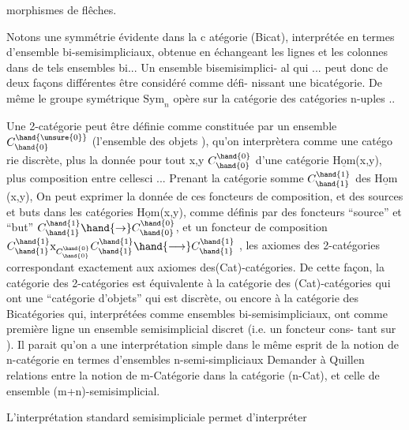 morphismes de flêches.

Notons une symmétrie évidente dans la c atégorie (Bicat), interprétée
en termes d'ensemble bi-semisimpliciaux, obtenue en échangeant les lignes
et les colonnes dans  de tels ensembles bi... Un ensemble bisemisimplici-%
al qui ... peut donc de deux façons différentes être considéré comme défi-%
nissant une bicatégorie. De même le groupe symétrique $\mathrm{Sym}_n$ opère sur
la catégorie   des catégories n-uples ..

Une 2-catégorie peut être définie comme constituée par un ensemble
 $C^{\hand{\unsure{0}}}_{\hand{0}}$ (l'ensemble des objets ), qu'on interprètera comme une catégo
rie discrète, plus la donnée pour tout x,y \hand{$\in$}$C^{\hand{0}}_{\hand{0}}$ d'une catégorie $\underline{\mathrm{Hom}}$(x,y),
plus   composition entre celles\unsure{\hand{-}}ci ... Prenant la catégorie somme  $C^{\hand{1}}_{\hand{1}}$
des $\underline{\mathrm{Hom}}$(x,y), On peut exprimer la donnée de ces foncteurs de composition,
et des sources et buts  dans les catégories $\underline{\mathrm{Hom}}$(x,y), comme définis par
des foncteurs ``source'' et ``but'' $C^{\hand{1}}_{\hand{1}} \hand{\to} C^{\hand{0}}_{\hand{0}}$, et un foncteur de composition
$C^{\hand{1}}_{\hand{1}} \mathrm{x}_{C^{\hand{0}}_{\hand{0}}} C^{\hand{1}}_{\hand{1}} \hand{\longrightarrow} C^{\hand{1}}_{\hand{1}}$ , les axiomes des 2-catégories correspondant exactement aux
axiomes des(Cat)-catégories. De cette façon, la catégorie des 2-catégories
est équivalente à la catégorie des (Cat)-catégories qui ont une ``catégorie
d'objets'' qui est discrète, ou encore à la catégorie des Bicatégories
qui, interprétées comme ensembles bi-semisimpliciaux, ont  comme
première ligne un ensemble semisimplicial discret (i.e. un foncteur cons-%
tant sur \hand{$\Delta$} ). Il parait qu'on a une interprétation simple dans le même
esprit de la notion de n-catégorie en termes d'ensembles n-semi-simpliciaux
\margin{$\|$}  Demander à Quillen relations entre la notion de m-Catégorie dans
\margin{$\|$} la catégorie (n-Cat), et celle de ensemble (m+n)-semisimplicial.
\margin{$\|$} 

L'interprétation standard semisimpliciale permet d'interpréter

